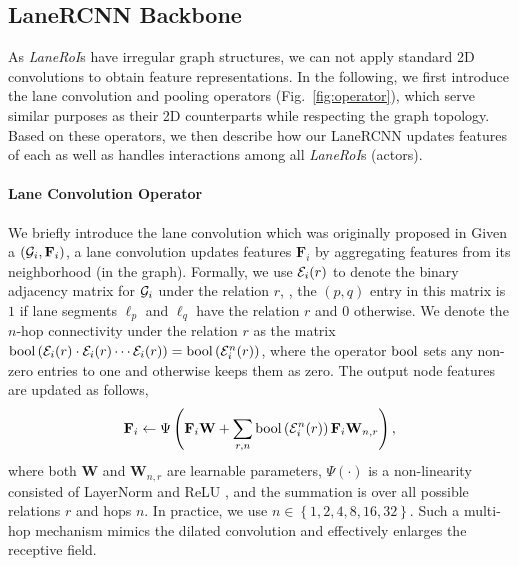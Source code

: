 \subsection{LaneRCNN Backbone}
\label{sec:backbone}
As \textit{LaneRoI}s have irregular graph structures, we can not apply standard
2D convolutions to obtain feature representations. In the following, we first introduce
the lane convolution and pooling operators (Fig.~\ref{fig:operator}), which serve similar
purposes as their 2D counterparts while respecting the graph topology. 
Based on these operators, we then describe how our LaneRCNN updates features of
each \ROI as well as handles interactions among all \textit{LaneRoI}s (actors).


\paragraph{Lane Convolution Operator}
We briefly introduce the lane convolution which was originally proposed in \cite{lgn}
Given a \ROI $(\mathcal{G}_i, \mathbf{F}_i)$, 
a lane convolution updates features $\mathbf{F}_i$ by aggregating features from
its neighborhood (in the graph). 
Formally, we use $\mathcal{E}_i(r)$ to denote the 
binary adjacency matrix for $\mathcal{G}_i$ under the relation $r$, \ie, the $(p, q)$ entry 
in this matrix is $1$ if lane segments $\ell_p$ and $\ell_q$ have the relation $r$ 
and $0$ otherwise. 
We denote the $n$-hop connectivity under the relation $r$ as the matrix 
$\operatorname{bool}\left(\mathcal{E}_i(r) \cdot \mathcal{E}_i(r) \cdots \mathcal{E}_i(r)\right) = \operatorname{bool}
\left(\mathcal{E}_i^n(r)\right)$, where the operator $\operatorname{bool}$ sets any non-zero entries to one 
and otherwise keeps them as zero. 
The output node features are updated as follows,
\begin{equation}
  \label{eq:conv}
  \mathbf{F}_i \leftarrow \Psi \left( \mathbf{F}_i\mathbf{W} + \sum_{r, n}
  \operatorname{bool} \left(\mathcal{E}_i^n(r)\right)\mathbf{F}_i\mathbf{W}_{n, r} \right),
\end{equation}
where both $\mathbf{W}$ and $\mathbf{W}_{n, r}$ are learnable
parameters, $\Psi(\cdot)$ is a non-linearity consisted of
LayerNorm \cite{layernorm} and ReLU \cite{relu},
and the summation is over all possible relations $r$
and hops $n$. In practice, we use 
$n \in \left\{1, 2, 4,
8, 16, 32\right\}$.
Such a multi-hop mechanism mimics the dilated convolution \cite{yu2015multi} and effectively enlarges
the receptive field.

